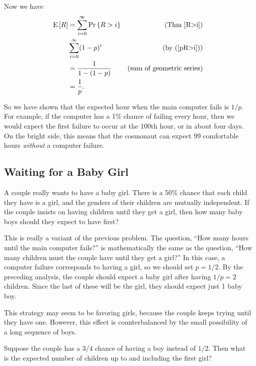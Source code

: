 \documentclass[11pt,twoside]{article}
\begin{document}
Now we have
\begin{align*}
\mathop{\textup{E}}\nolimits\left[R\right]  & = \sum_{i=0}^{\infty} \mathop{\textup{Pr}}\nolimits\left\{R > i\right\} & \text{(Thm~\ref{R>i})}\\
   & \sum_{i=0}^{\infty} (1-p)^i \label{fail1} & \text{(by~(\ref{pR>i}))}\\
        & =   \frac{1}{1 - (1-p)} & \text{(sum of geometric series)}\\
        & =   \frac{1}{p}.
\end{align*}

So we have shown that the expected hour when the main computer fails is
$1/p$.  For example, if the computer has a 1\% chance of failing every
hour, then we would expect the first failure to occur at the 100th hour,
or in about four days.  On the bright side, this means that the cosmonaut
can expect 99 comfortable hours {\em without} a computer failure.


\subsection{Waiting for a Baby Girl}

A couple really wants to have a baby girl.  There is a 50\% chance
that each child they have is a girl, and the genders of their children
are mutually independent.  If the couple insists on having children
until they get a girl, then how many baby boys should they expect
to have first?

This is really a variant of the previous problem.  The question, ``How
many hours until the main computer fails?'' is mathematically the same
as the question, ``How many children must the couple have until they
get a girl?''  In this case, a computer failure corresponds to having
a girl, so we should set $p = 1/2$.  By the preceding analysis, the
couple should expect a baby girl after having $1/p = 2$ children.
Since the last of these will be the girl, they should expect just 1
baby boy.

This strategy may seem to be favoring girls, because the couple keeps
trying until they have one.  However, this effect is counterbalanced
by the small possibility of a long sequence of boys.

Suppose the couple has a $3/4$ chance of having a boy instead of
$1/2$.  Then what is the expected number of children up to and
including the first girl?
\end{document}
